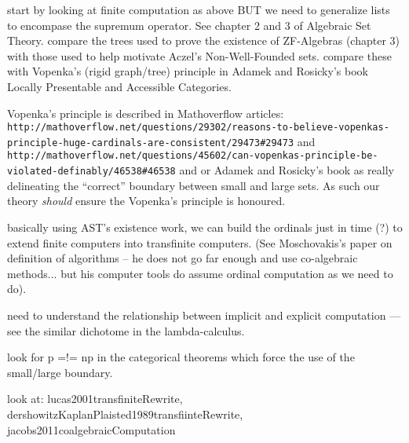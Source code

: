 \documentclass[a4paper,openany]{amsbook}
\begin{document}
start by looking at finite computation as above BUT we need to generalize lists
to encompase the supremum operator. See chapter 2 and 3 of Algebraic Set Theory.
compare the trees used to prove the existence of ZF-Algebras (chapter 3) with
those used to help motivate Aczel's Non-Well-Founded sets. compare these with
Vopenka's (rigid graph/tree) principle in Adamek and Rosicky's book Locally
Presentable and Accessible Categories.

Vopenka's principle is described in Mathoverflow articles:
\verb|http://mathoverflow.net/questions/29302/reasons-to-believe-vopenkas-principle-huge-cardinals-are-consistent/29473#29473|
and
\verb|http://mathoverflow.net/questions/45602/can-vopenkas-principle-be-violated-definably/46538#46538|
and or Adamek and Rosicky's book as really delineating the ``correct'' boundary
between small and large sets. As such our theory \emph{should} ensure the
Vopenka's principle is honoured.

basically using AST's existence work, we can build the ordinals just in time (?)
to extend finite computers into transfinite computers. (See Moschovakis's paper
on definition of algorithms -- he does not go far enough and use co-algebraic
methods... but his computer tools do assume ordinal computation as we need to
do).

need to understand the relationship between implicit and explicit computation
--- see the similar dichotome in the lambda-calculus.

look for p =!= np in the categorical theorems which force the use of the
small/large boundary.

look at: lucas2001transfiniteRewrite,
dershowitzKaplanPlaisted1989transfiinteRewrite,
jacobs2011coalgebraicComputation



\end{document}

